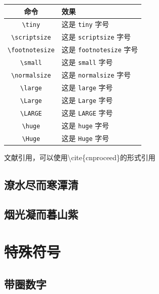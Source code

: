 \documentclass{QHUthesis}
\begin{document}
\begin{table}
	\centering
	\begin{tabular}{|c|l|}
		\hline
		\textbf{命令} & \textbf{效果} \\
		\hline
		\verb|\tiny| & {\tiny 这是 \texttt{tiny} 字号} \\
		\hline
		\verb|\scriptsize| & {\scriptsize 这是 \texttt{scriptsize} 字号} \\
		\hline
		\verb|\footnotesize| & {\footnotesize 这是 \texttt{footnotesize} 字号} \\
		\hline
		\verb|\small| & {\small 这是 \texttt{small} 字号} \\
		\hline
		\verb|\normalsize| & {\normalsize 这是 \texttt{normalsize} 字号} \\
		\hline
		\verb|\large| & {\large 这是 \texttt{large} 字号} \\
		\hline
		\verb|\Large| & {\Large 这是 \texttt{Large} 字号} \\
		\hline
		\verb|\LARGE| & {\LARGE 这是 \texttt{LARGE} 字号} \\
		\hline
		\verb|\huge| & {\huge 这是 \texttt{huge} 字号} \\
		\hline
		\verb|\Huge| & {\Huge 这是 \texttt{Huge} 字号} \\
		\hline
	\end{tabular}
\end{table}

文献引用\cite{cnproceed}，可以使用\textbackslash cite\{cnproceed\}的形式引用

\zhlipsum[1]

\section{潦水尽而寒潭清}
\zhlipsum[1-5]
\section{烟光凝而暮山紫}


\chapter{特殊符号}

\section{带圈数字}
\end{document}
